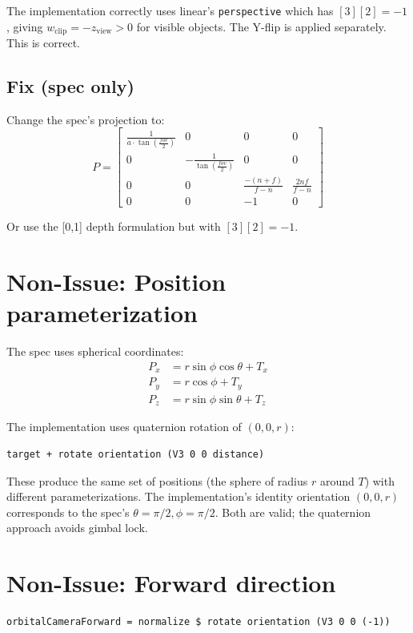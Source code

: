 \documentclass{article}
\begin{document}
The implementation correctly uses linear's \texttt{perspective} which has
$[3][2] = -1$, giving $w_\text{clip} = -z_\text{view} > 0$ for visible
objects. The Y-flip is applied separately. This is correct.

\subsection{Fix (spec only)}

Change the spec's projection to:
\[
P = \begin{bmatrix}
\frac{1}{a \cdot \tan(\frac{fov}{2})} & 0 & 0 & 0 \\
0 & -\frac{1}{\tan(\frac{fov}{2})} & 0 & 0 \\
0 & 0 & \frac{-(n+f)}{f-n} & \frac{2nf}{f-n} \\
0 & 0 & -1 & 0
\end{bmatrix}
\]

Or use the [0,1] depth formulation but with $[3][2] = -1$.

\section{Non-Issue: Position parameterization}

The spec uses spherical coordinates:
\begin{align*}
P_x &= r \sin\phi \cos\theta + T_x \\
P_y &= r \cos\phi + T_y \\
P_z &= r \sin\phi \sin\theta + T_z
\end{align*}

The implementation uses quaternion rotation of $(0, 0, r)$:
\begin{verbatim}
target + rotate orientation (V3 0 0 distance)
\end{verbatim}

These produce the same set of positions (the sphere of radius $r$ around $T$)
with different parameterizations. The implementation's identity orientation
$(0, 0, r)$ corresponds to the spec's $\theta = \pi/2, \phi = \pi/2$.
Both are valid; the quaternion approach avoids gimbal lock.

\section{Non-Issue: Forward direction}

\begin{verbatim}
orbitalCameraForward = normalize $ rotate orientation (V3 0 0 (-1))
\end{verbatim}
\end{document}
